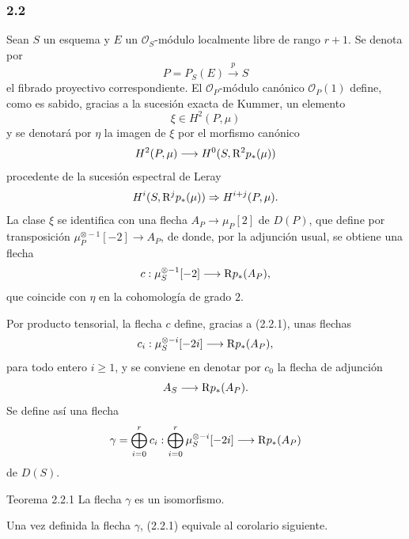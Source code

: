 \subsubsection*{2.2}
Sean $S$ un esquema y $E$ un $\mathcal O_S$-módulo localmente libre de rango $r+1$. Se denota por
\[
P=P_S(E)\xrightarrow{p}S
\]
el fibrado proyectivo correspondiente. El $\mathcal O_P$-módulo canónico $\mathcal O_P(1)$ define, como es sabido, gracias a la sucesión exacta de Kummer, un elemento
\[
\xi\in H^2(P,\mu)
\]
y se denotará por $\eta$ la imagen de $\xi$ por el morfismo canónico
\[
H^2(P,\mu)\longrightarrow H^0(S,\mathrm{R}^2p_*(\mu))
\]
procedente de la sucesión espectral de Leray
\[
H^i(S,\mathrm{R}^jp_*(\mu))\Rightarrow H^{i+j}(P,\mu).
\]
La clase $\xi$ se identifica con una flecha $A_P\to\mu_P[2]$ de $D(P)$, que define por transposición $\mu_P^{\otimes -1}[-2]\to A_P$, de donde, por la adjunción usual, se obtiene una flecha
\[
c:\mu_S^{\otimes -1}[-2]\longrightarrow \mathrm{R} p_*(A_P),
\]
que coincide con $\eta$ en la cohomología de grado $2$.

Por producto tensorial, la flecha $c$ define, gracias a (2.2.1), unas flechas
\[
c_i:\mu_S^{\otimes -i}[-2i]\longrightarrow \mathrm{R} p_*(A_P),
\]
para todo entero $i\ge1$, y se conviene en denotar por $c_0$ la flecha de adjunción
\[
A_S\longrightarrow \mathrm{R} p_*(A_P).
\]
Se define así una flecha
\[
\gamma=\bigoplus_{i=0}^{r}c_i:
\bigoplus_{i=0}^{r}\mu_S^{\otimes -i}[-2i]\longrightarrow \mathrm{R} p_*(A_P)
\]
de $D(S)$.

\begin{statement}{Teorema 2.2.1}
La flecha $\gamma$ es un isomorfismo.
\end{statement}

Una vez definida la flecha $\gamma$, (2.2.1) equivale al corolario siguiente.
